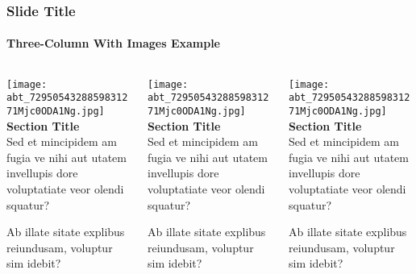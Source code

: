 \documentclass[
	aspectratio=169, %
	t, %
	onlytextwidth, %
	10pt, %
]{beamer}
\begin{document}
\begin{frame}
	\frametitle{Slide Title}
	\framesubtitle{Three-Column With Images Example}
	
	\small %
	
	\begin{columns}[T] %
		\begin{column}{0.3\linewidth} %
			\texttt{[image: abt\_7295054328859831271Mjc0ODA1Ng.jpg]}\\[3pt]
			\textbf{Section Title}\\			
			Sed et mincipidem am fugia ve nihi aut utatem invellupis dore voluptatiate veor olendi squatur?
	
			Ab illate sitate explibus reiundusam, voluptur sim idebit?
		\end{column}
		\begin{column}{0.3\linewidth} %
			\texttt{[image: abt\_7295054328859831271Mjc0ODA1Ng.jpg]}\\[3pt]
			\textbf{Section Title}\\			
			Sed et mincipidem am fugia ve nihi aut utatem invellupis dore voluptatiate veor olendi squatur?
	
			Ab illate sitate explibus reiundusam, voluptur sim idebit?
		\end{column}
		\begin{column}{0.3\linewidth} %
			\texttt{[image: abt\_7295054328859831271Mjc0ODA1Ng.jpg]}\\[3pt]
			\textbf{Section Title}\\			
			Sed et mincipidem am fugia ve nihi aut utatem invellupis dore voluptatiate veor olendi squatur?
	
			Ab illate sitate explibus reiundusam, voluptur sim idebit?
		\end{column}
	\end{columns}
\end{frame}

\end{document}

